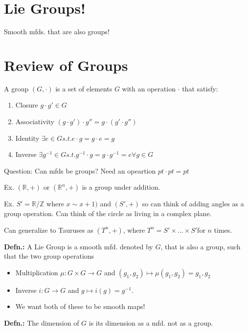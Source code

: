 \documentclass[12pt,letterpaper]{article}
\begin{document}
\section*{Lie Groups!}

Smooth mfds. that are also groups! 

\section{Review of Groups}
A group $(G, \cdot )$ is a set of elements $G$ with an operation $\cdot$ that satisfy:

\begin{enumerate}
    \item Closure $g \cdot g' \in G$
    \item Associativity $(g \cdot g')\cdot g'' = g\cdot (g' \cdot g'')$
    \item Identity $\exists e \in G s.t. e\cdot g = g \cdot e = g$
    \item Inverse $\exists g^{-1} \in G s.t. g^{-1} \cdot g = g \cdot g^{-1} = e \forall g \in G$
\end{enumerate}

Question: Can mfds be groups? Need an opeartion $pt \cdot pt = pt$

Ex. $(\mathbb{R}, + )$ or $(\mathbb{R}^n, + )$ is a group under addition.

Ex. $S' = \mathbb{R}/\mathbb{Z}$ where $x \sim x+1)$ and $(S', +)$ so can think of adding angles as a group operation. Can think of the circle as living in a complex plane.

Can generalize to Tauruses as $(T^n, +)$, where $T^n = S' \times \dots \times S'$for $n$ times.

\textbf{Defn.:} A Lie Group is a smooth mfd. denoted by $G$, that is also a group, such that the two group operations 
\begin{itemize}
    \item Multiplication $\mu : G \times G \rightarrow G$ and $(g_1, g_2) \mapsto \mu(g_1, g_2) = g_1, g_2$
    \item Inverse $i: G \rightarrow G$ and $g \mapsto i(g) = g^{-1}$.
    \item We want both of these to be smooth maps!
\end{itemize}

\textbf{Defn.:} The dimension of $G$ is its dimension as a mfd. not as a group. 
\end{document}
